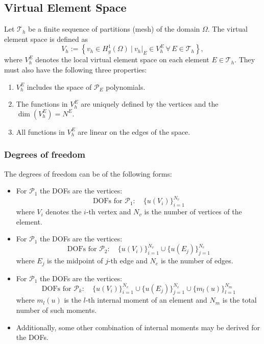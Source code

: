 \documentclass[class=article, crop=false]{standalone}
\begin{document}
\subsection{Virtual Element Space}
Let $\mathcal{T}_h$ be a finite sequence of partitions (mesh) of the domain $\Omega$. The virtual element space is defined as
$$
V_h := \left\{ v_h \in H^1_g(\Omega) \ \bigg| \ v_h|_E \in V_h^E \ \forall \, E \in \mathcal{T}_h \right\},
$$
where $V_h^E$ denotes the local virtual element space on each element $E \in \mathcal{T}_h$. They must also have the following three properties:
\begin{enumerate}
    \item $V^E_h$ includes the space of $\mathcal{P}_E$ polynomials.

    \item The functions in $V^E_h$ are uniquely defined by the vertices and the$\operatorname{dim}(V^E_h) = N^E.$

    \item All functions in $V^E_h$ are linear on the edges of the space.
\end{enumerate}
\cite{sutton2017virtual}



\subsubsection{Degrees of freedom}
The degrees of freedom can be of the following forms:
\begin{itemize}
    \item For $\mathcal{P}_1$ the DOFs are the vertices:
    $$\text{DOFs for } \mathcal{P}_1: \quad \{ u(V_i) \}_{i=1}^{N_v}$$
    where $V_i$ denotes the $i$-th vertex and $N_v$ is the number of vertices of the element.
    
    \item For $\mathcal{P}_1$ the DOFs are the vertices:
    $$\text{DOFs for } \mathcal{P}_2: \quad \{ u(V_i) \}_{i=1}^{N_v} \cup \{ u(E_j) \}_{j=1}^{N_e}$$
    where $E_j$ is the midpoint of $j$-th edge and $N_e$ is the number of edges.
    
    \item For $\mathcal{P}_1$ the DOFs are the vertices:
    $$\text{DOFs for } \mathcal{P}_k: \quad \{ u(V_i) \}_{i=1}^{N_v} \cup \{ u(E_j) \}_{j=1}^{N_e} \cup \{ m_l(u) \}_{l=1}^{N_m}$$
    where $m_l(u)$ is the $l$-th internal moment of an element and $N_m$ is the total number of such moments.

    \item Additionally, some other combination of internal moments may be derived for the DOFs.    
\end{itemize}
\end{document}
